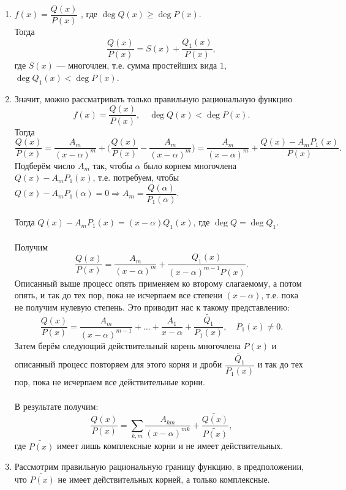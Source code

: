 \begin{Proof}
	\begin{enumerate}
		\item $ f(x) =  \dfrac{Q(x)}{P(x)} $ , где $\deg Q(x) \geqslant \deg P(x).$ \\
		Тогда  \[ \frac{Q(x)}{P(x)} = S(x) + \frac{Q_1(x)}{P(x)}, \] где $S(x)$ --- многочлен, т.е. сумма простейших вида $1$, $\deg Q_1(x) < \deg P(x)$.
		\item Значит, можно рассматривать только правильную рациональную функцию \\
		\[
		f(x) = 
		\frac{Q(x)}{P(x)},\quad \deg Q(x) < \deg P(x).
		\]	Тогда $$ \frac{Q(x)}{P(x)} = \frac{A_m}{(x - \alpha)^m} + \Big( \frac{Q(x)}{P(x)} - \frac{A_m}{(x - \alpha)^m}\Big) = \frac{A_m}{(x - \alpha)^m} + \frac{Q(x) - A_m P_1(x)}{P(x)}.$$
		Подберём число $A_m$ так, чтобы $\alpha$ было корнем многочлена $ Q(x) - A_m P_1(x) $, т.е. потребуем, чтобы $ Q(x) - A_m P_1(\alpha) = 0 \Rightarrow A_m = \dfrac{Q(\alpha)}{P_1(\alpha)} $. \\\\
		Тогда $ Q(x) -  A_m P_1(x) = (x - \alpha) Q_1(x) $, где $\deg Q = \deg Q_1$.\\\\
		Получим $$  \frac{Q(x)}{P(x)} = \frac{A_m}{(x - \alpha)^m} + \frac{Q_1(x)}{(x - \alpha)^{m - 1} P(x)}.$$
		Описанный выше процесс опять применяем ко второму слагаемому, а потом опять, и так до тех пор, пока не исчерпаем все степени $ (x - \alpha) $, т.е. пока не получим нулевую степень. Это приводит нас к такому представлению:
		$$ \frac{Q(x)}{P(x)} = \frac{A_m}{(x - \alpha)^{m - 1}} + \ldots + \frac{A_1}{x - \alpha} + \frac{\widetilde{Q_1}}{P_1(x)}, \quad P_1(x) \neq 0.$$
		Затем берём следующий действительный корень многочлена $P(x)$ и описанный процесс повторяем для этого корня и дроби $ \dfrac{\widetilde{Q_1}}{P_1(x)}$ и так до тех пор, пока не исчерпаем все действительные корни.\\\\
		В результате получим:\\
		$$ \frac{Q(x)}{P(x)} = \sum\limits_{k, m} \frac{A_{km}}{(x - \alpha)^{mk}} + \frac{\widetilde{Q(x)}}{\widetilde{P(x)}}, $$ где $ \widetilde{P(x)} $ имеет лишь комплексные корни и не имеет действительных.
		\item  Рассмотрим правильную рациональную границу функцию, в предположении, что $ \widetilde{P(x)} $ не имеет действительных корней, а только комплексные.\\\\

\end{enumerate}
\end{Proof}
